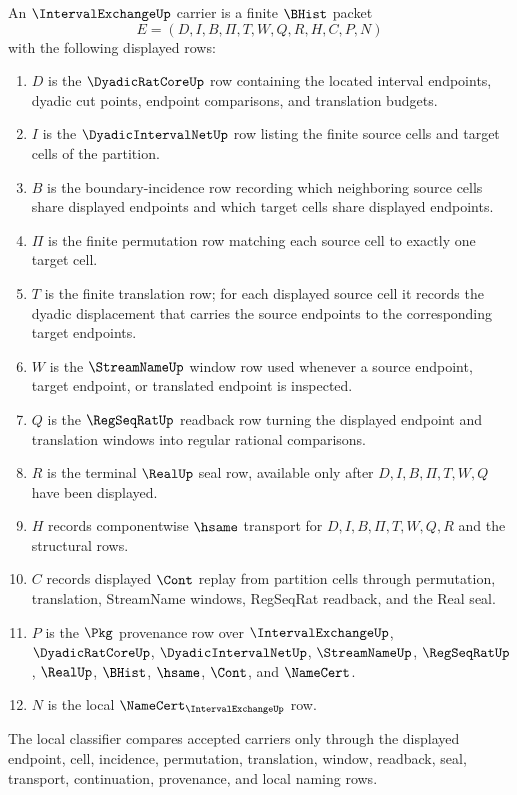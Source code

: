 \begin{definition}
\label{def:interval-exchange-carrier}
An $\IntervalExchangeUp$ carrier is a finite $\BHist$ packet
$$
E=(D,I,B,\Pi,T,W,Q,R,H,C,P,N)
$$
with the following displayed rows:
\begin{enumerate}
\item $D$ is the $\DyadicRatCoreUp$ row containing the located interval endpoints, dyadic cut points, endpoint comparisons, and translation budgets.
\item $I$ is the $\DyadicIntervalNetUp$ row listing the finite source cells and target cells of the partition.
\item $B$ is the boundary-incidence row recording which neighboring source cells share displayed endpoints and which target cells share displayed endpoints.
\item $\Pi$ is the finite permutation row matching each source cell to exactly one target cell.
\item $T$ is the finite translation row; for each displayed source cell it records the dyadic displacement that carries the source endpoints to the corresponding target endpoints.
\item $W$ is the $\StreamNameUp$ window row used whenever a source endpoint, target endpoint, or translated endpoint is inspected.
\item $Q$ is the $\RegSeqRatUp$ readback row turning the displayed endpoint and translation windows into regular rational comparisons.
\item $R$ is the terminal $\RealUp$ seal row, available only after $D,I,B,\Pi,T,W,Q$ have been displayed.
\item $H$ records componentwise $\hsame$ transport for $D,I,B,\Pi,T,W,Q,R$ and the structural rows.
\item $C$ records displayed $\Cont$ replay from partition cells through permutation, translation, StreamName windows, RegSeqRat readback, and the Real seal.
\item $P$ is the $\Pkg$ provenance row over $\IntervalExchangeUp$, $\DyadicRatCoreUp$, $\DyadicIntervalNetUp$, $\StreamNameUp$, $\RegSeqRatUp$, $\RealUp$, $\BHist$, $\hsame$, $\Cont$, and $\NameCert$.
\item $N$ is the local $\NameCert_{\IntervalExchangeUp}$ row.
\end{enumerate}
The local classifier compares accepted carriers only through the displayed endpoint, cell, incidence, permutation, translation, window, readback, seal, transport, continuation, provenance, and local naming rows.
\end{definition}

